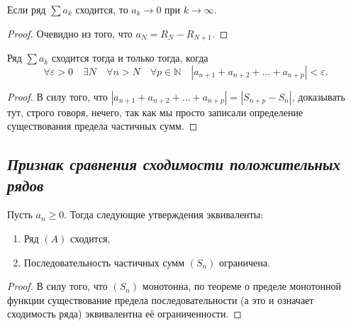 \hypertarget{необходимое условие сходимости}{}
\begin{corollary}
	Если ряд \(\sum a_k\) сходится, то \(a_k \to 0\) при \(k \to \infty\).
\end{corollary}
\begin{proof}
	Очевидно из того, что \(a_N = R_N - R_{N+1}\).
\end{proof}

\begin{theorem}
	Ряд \(\sum a_k\) сходится тогда и только тогда, когда \[
		\forall \varepsilon > 0 \quad \exists N \quad \forall n > N \quad \forall p \in \mathbb{N} \quad |a_{n+1} + a_{n+2} + \ldots + a_{n+p}| < \varepsilon.
	\]
\end{theorem}
\begin{proof}
	В силу того, что \(|a_{n+1} + a_{n+2} + \ldots + a_{n+p}| = |S_{n + p} - S_n|\), доказывать тут, строго говоря, нечего, так как мы просто записали определение существования предела частичных сумм.
\end{proof}

\subsection{\itshape Признак сравнения сходимости положительных рядов}

\begin{lemma}
	Пусть \(a_n \geqslant 0\). Тогда следующие утверждения эквиваленты:
	\begin{enumerate}
		\item Ряд \((A)\) сходится,
		\item Последовательность частичных сумм \((S_n)\) ограничена.
	\end{enumerate}
\end{lemma}
\begin{proof}
	В силу того, что \((S_n)\) монотонна, по теореме о пределе монотонной функции существование предела последовательности (а это и означает сходимость ряда) эквивалентна её ограниченности.
\end{proof}

